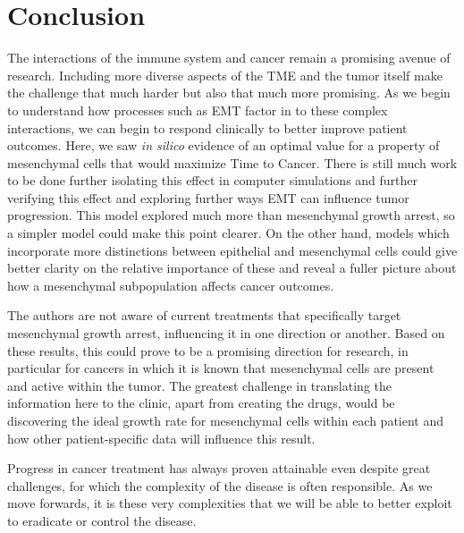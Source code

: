 \documentclass[11pt, preprint]{article}
\begin{document}




\section{Conclusion}\label{Conclusion}
The interactions of the immune system and cancer remain a promising avenue of research.
Including more diverse aspects of the TME and the tumor itself make the challenge that much harder but also that much more promising.
As we begin to understand how processes such as EMT factor in to these complex interactions, we can begin to respond clinically to better improve patient outcomes.
Here, we saw {\it in silico} evidence of an optimal value for a property of mesenchymal cells that would maximize Time to Cancer.
There is still much work to be done further isolating this effect in computer simulations and further verifying this effect and exploring further ways EMT can influence tumor progression.
This model explored much more than mesenchymal growth arrest, so a simpler model could make this point clearer.
On the other hand, models which incorporate more distinctions between epithelial and mesenchymal cells could give better clarity on the relative importance of these and reveal a fuller picture about how a mesenchymal subpopulation affects cancer outcomes.

The authors are not aware of current treatments that specifically target mesenchymal growth arrest, influencing it in one direction or another.
%
Based on these results, this could prove to be a promising direction for research, in particular for cancers in which it is known that mesenchymal cells are present and active within the tumor.
The greatest challenge in translating the information here to the clinic, apart from creating the drugs, would be discovering the ideal growth rate for mesenchymal cells within each patient and how other patient-specific data will influence this result.

Progress in cancer treatment has always proven attainable even despite great challenges, for which the complexity of the disease is often responsible. As we move forwards, it is these very complexities that we will be able to better exploit to eradicate or control the disease.




\end{document}
